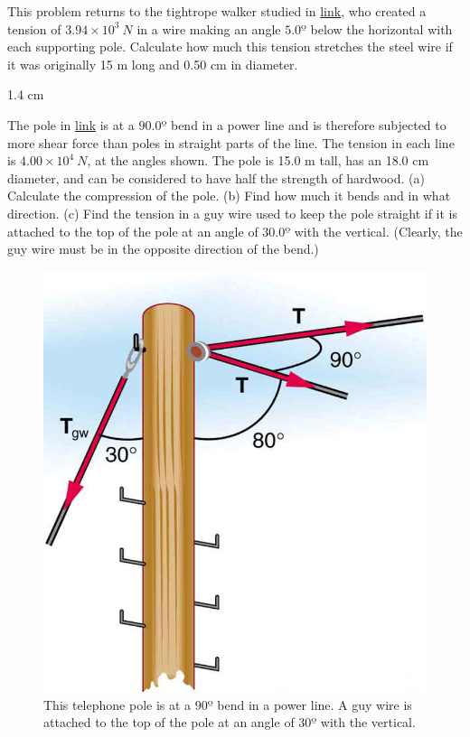 \documentclass[
]{book}
\newenvironment{problems-exercises}{}{}
\begin{document}
\begin{problems-exercises}
\hypertarget{fs-id1165298740744}{}
\leavevmode\hypertarget{fs-id1165298520715}{}%
This problem returns to the tightrope walker studied in
\href{/m54857\#fs-id986136}{link}, who created a
tension of \({3\text{.}{\text{94} \times \text{10}^{3}}\ N}{}\) in a wire
making an angle \(\text{5.0º}\) below the horizontal with each supporting
pole. Calculate how much this tension stretches the steel wire if it was
originally 15 m long and 0.50 cm in diameter.

\leavevmode\hypertarget{fs-id1165298866753}{}%
1.4 cm

\hypertarget{fs-id1165296233210}{}
\leavevmode\hypertarget{fs-id1165298620362}{}%
The pole in \protect\hyperlink{import-auto-id1165296309614}{link}
is at a \(\text{90.0º}\) bend in a power line and is therefore subjected
to more shear force than poles in straight parts of the line. The
tension in each line is
\({4\text{.}{\text{00} \times \text{10}^{4}}\ N}{}\), at the angles shown.
The pole is 15.0 m tall, has an 18.0 cm diameter, and can be considered
to have half the strength of hardwood. (a) Calculate the compression of
the pole. (b) Find how much it bends and in what direction. (c) Find the
tension in a guy wire used to keep the pole straight if it is attached
to the top of the pole at an angle of \(\text{30.0º}\) with the vertical.
(Clearly, the guy wire must be in the opposite direction of the bend.)

\begin{figure}
\hypertarget{import-auto-id1165296309614}{%
\centering
\includegraphics{images/Figure_06_03_10a.jpg}
\caption{This telephone pole is at a \({\text{90}\text{º}}{}\) bend in a power
line. A guy wire is attached to the top of the pole at an angle of
\({\text{30}\text{º}}{}\) with the
vertical.}\label{import-auto-id1165296309614}
}
\end{figure}

\end{problems-exercises}
\end{document}
